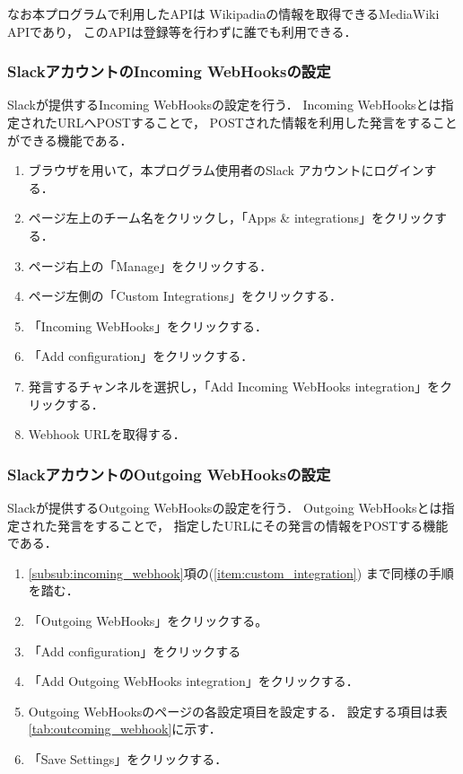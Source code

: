 \documentclass[fleqn, 14pt]{extarticlej}
\begin{document}
なお本プログラムで利用したAPIは
Wikipadiaの情報を取得できるMediaWiki API\cite{Media-Wiki}であり，
このAPIは登録等を行わずに誰でも利用できる．

\subsubsection{SlackアカウントのIncoming WebHooksの設定}
Slackが提供するIncoming WebHooksの設定を行う．
Incoming WebHooksとは指定されたURLへPOSTすることで，
POSTされた情報を利用した発言をすることができる機能である．
\label{subsub:incoming_webhook}
\begin{enumerate}
\item ブラウザを用いて，本プログラム使用者のSlack アカウントにログインする．
\item ページ左上のチーム名をクリックし，「Apps \& integrations」をクリックする．
\item ページ右上の「Manage」をクリックする．
\item \label{item:custom_integration}
  ページ左側の「Custom Integrations」をクリックする．
\item 「Incoming WebHooks」をクリックする．
\item 「Add configuration」をクリックする．
\item 発言するチャンネルを選択し，「Add Incoming WebHooks integration」をクリックする．
\item \label{item:get_webhookurl}Webhook URLを取得する． 
\end{enumerate}


\subsubsection{SlackアカウントのOutgoing WebHooksの設定}
Slackが提供するOutgoing WebHooksの設定を行う．
Outgoing WebHooksとは指定された発言をすることで，
指定したURLにその発言の情報をPOSTする機能である．
\label{subsub:outcoming_webhook}
\begin{enumerate}
\item \ref{subsub:incoming_webhook}項の(\ref{item:custom_integration})
  まで同様の手順を踏む．
\item 「Outgoing WebHooks」をクリックする。
\item 「Add configuration」をクリックする
\item 「Add Outgoing WebHooks integration」をクリックする．
\item Outgoing WebHooksのページの各設定項目を設定する．
  設定する項目は表\ref{tab:outcoming_webhook}に示す．
\item「Save Settings」をクリックする．
\end{enumerate}
\end{document}
